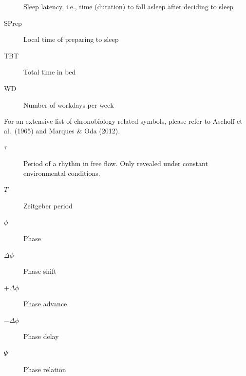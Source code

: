 \documentclass[
  12pt,
  a4paper,
  oneside]{tesesusp}
\begin{document}
\begin{siglas}
\begin{description}
Sleep latency, i.e., time (duration) to fall asleep after deciding to
sleep
\item[SPrep]
\hspace{20cm}

Local time of preparing to sleep
\item[TBT]
\hspace{20cm}

Total time in bed
\item[WD]
\hspace{20cm}

Number of workdays per week
\end{description}
\end{siglas}


\setlength{\absparsep}{12pt}
\begin{simbolos}
For an extensive list of chronobiology related symbols, please refer to
Aschoff et al.~(1965) and Marques \& Oda (2012).

\begin{description}
\item[\(\tau\)]
\hspace{20cm}

Period of a rhythm in free flow. Only revealed under constant
environmental conditions.
\item[\(T\)]
\hspace{20cm}

Zeitgeber period
\item[\(\phi\)]
\hspace{20cm}

Phase
\item[\(\Delta\phi\)]
\hspace{20cm}

Phase shift
\item[\(+\Delta\phi\)]
\hspace{20cm}

Phase advance
\item[\(-\Delta\phi\)]
\hspace{20cm}

Phase delay
\item[\(\Psi\)]
\hspace{20cm}

Phase relation
\end{description}
\end{simbolos}
\end{document}
